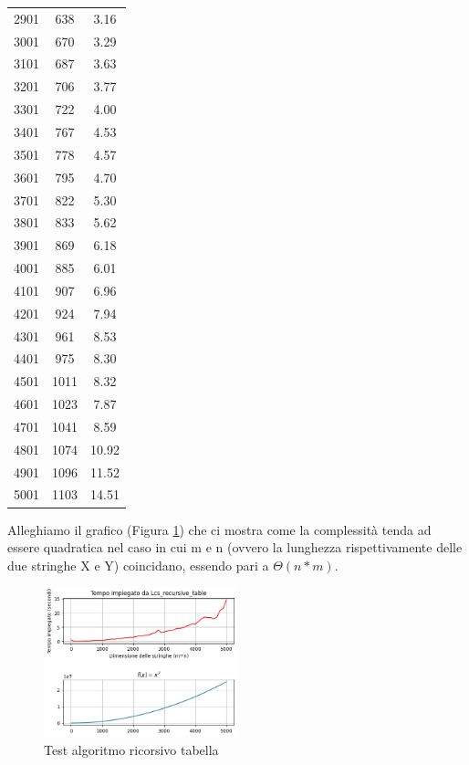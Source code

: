 \documentclass[11pt,a4paper]{article}
\begin{document}
\begin{longtable}{|c|c|c|}
    2901 & 638 & 3.16 \\
    3001 & 670 & 3.29 \\
    3101 & 687 & 3.63 \\
    3201 & 706 & 3.77 \\
    3301 & 722 & 4.00 \\
    3401 & 767 & 4.53 \\
    3501 & 778 & 4.57 \\
    3601 & 795 & 4.70 \\
    3701 & 822 & 5.30 \\
    3801 & 833 & 5.62 \\
    3901 & 869 & 6.18 \\
    4001 & 885 & 6.01 \\
    4101 & 907 & 6.96 \\
    4201 & 924 & 7.94 \\
    4301 & 961 & 8.53 \\
    4401 & 975 & 8.30 \\
    4501 & 1011 & 8.32 \\
    4601 & 1023 & 7.87 \\
    4701 & 1041 & 8.59 \\
    4801 & 1074 & 10.92 \\
    4901 & 1096 & 11.52 \\
    5001 & 1103 & 14.51 \\
\end{longtable}


Alleghiamo il grafico (Figura \ref{fig:lcs_recursive_table_test}) che ci mostra come la complessità tenda ad essere quadratica nel caso in cui m e n (ovvero la lunghezza rispettivamente delle due stringhe X e Y) coincidano, essendo pari a $\Theta(n*m)$.

\begin{figure}[htbp]
    \centering
    \includegraphics[width=0.5\textwidth]{LCS_recursive_table test.png}
    \caption{Test algoritmo ricorsivo tabella}
    \label{fig:lcs_recursive_table_test}
\end{figure}
\end{document}
